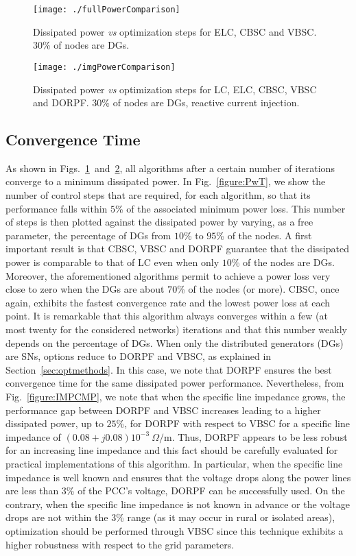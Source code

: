 \documentclass[journal]{IEEEtran}
\newcommand{\fig}[1]{Fig.~\ref{#1}}
\newcommand{\figs}[2]{Figs.~\ref{#1}~and~\ref{#2}}
\newcommand{\secref}[1]{Section~\ref{#1}}
\begin{document}
\begin{figure}
\centering
\texttt{[image: ./fullPowerComparison]}
\caption{Dissipated power {\it vs} optimization steps for ELC, CBSC and VBSC. $30$\% of nodes are DGs.\label{figure:fullPowerComp}}
\end{figure}

\begin{figure}
\centering
\texttt{[image: ./imgPowerComparison]}
\caption{Dissipated power {\it vs} optimization steps for LC, ELC, CBSC, VBSC and DORPF. $30$\% of nodes are DGs, reactive current injection.\label{figure:imgPowerComp}}
\end{figure}


\subsection{Convergence Time}
\label{ssec:algoConvergence}

As shown in \figs{figure:fullPowerComp}{figure:imgPowerComp}, all algorithms after a certain number of iterations converge to a minimum dissipated power. In \fig{figure:PwT}, we show the number of control steps that are required, for each algorithm, so that its performance 
falls within $5$\% of the associated minimum power loss. This number of steps is then plotted against the dissipated power by varying, as a free parameter, the percentage of DGs from $10$\% to $95$\% of the nodes. A first important result is that CBSC, VBSC and DORPF guarantee that the dissipated power is comparable to that of LC even when only $10$\% of the nodes are DGs. Moreover, the aforementioned algorithms permit to achieve a  power loss very close to zero when the DGs are about $70$\% of the nodes (or more). CBSC, once again, exhibits the fastest convergence rate and the lowest power loss at each point. It is remarkable that this algorithm always converges within a few (at most twenty for the considered networks) iterations and that this number weakly depends on the percentage of DGs. When only the distributed generators (DGs) are SNs, options reduce to DORPF and VBSC, as explained in \secref{sec:optmethods}. In this case, we note that DORPF ensures the best convergence time for the same dissipated power performance. Nevertheless, from \fig{figure:IMPCMP}, we note that when the specific line impedance grows, the  performance gap between DORPF and VBSC increases leading to a higher dissipated power, up to $25$\%, for DORPF with respect to VBSC for a specific line impedance of $(0.08+j0.08)10^{-3} \ \Omega/\text{m}$. Thus, DORPF appears to be less robust for an increasing line impedance and this fact should be carefully evaluated for practical implementations of this algorithm. In particular, when the specific line impedance is well known and ensures that the voltage drops along the power lines are less than $3$\% of the PCC's voltage, DORPF can be successfully used. On the contrary, when the specific line impedance is not known in advance or the voltage drops are not within the $3$\% range (as it may occur in rural or isolated areas), optimization should be performed through VBSC since this technique exhibits a higher robustness with respect to the grid parameters.
\end{document}
